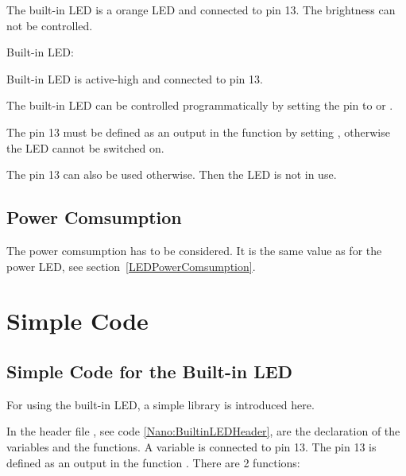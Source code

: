 The built-in LED is a orange LED and connected to pin 13. The brightness can not be controlled. \cite{Arduino:2023a,Arduino:2023}

\begin{description}
    \item [Built-in LED:] 
\end{description}

Built-in LED is active-high and connected to pin 13.

The built-in LED can be controlled programmatically by setting the pin to  or . 



The pin 13 must be defined as an output in the function  by setting , otherwise the LED cannot be switched on.

\medskip 


The pin 13 can also be used otherwise. Then the LED is not in use.



\subsection{Power Comsumption}

The power comsumption has to be considered. It is the same value as for the power LED, see section~\ref{LEDPowerComsumption}.


%

\section{Simple Code}

\subsection{Simple Code for the Built-in LED}

For using the built-in LED, a simple library is introduced here.

\medskip


In the header file , see code \ref{Nano:BuiltinLEDHeader}, are the declaration of the variables and the  functions. A variable is connected to pin 13. The pin 13 is defined as an output in the function . There are  2 functions:

